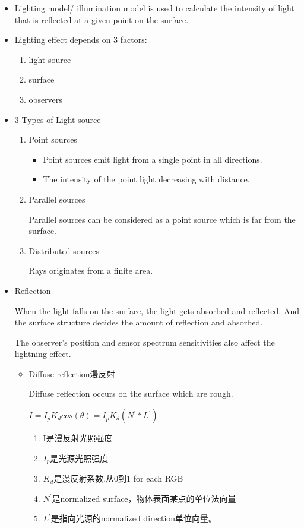 \documentclass[UTF8]{ctexart}
\begin{document}
\begin{itemize}
    \item Lighting model/ illumination model is used to calculate the intensity of light that is reflected at a given point on the surface.
    \item Lighting effect depends on 3 factors:
    \begin{enumerate}
        \item light source 
        \item surface 
        \item observers
    \end{enumerate}
    \item 3 Types of Light source 
    \begin{enumerate}
        \item Point sources
        \begin{itemize}
            \item Point sources emit light from a single point in all directions.
            \item The intensity of the point light decreasing with distance.
        \end{itemize}
        \item Parallel sources
        
        Parallel sources can be considered as a point source which is far from the surface.

        \item Distributed sources
        
        Rays originates from a finite area.

    \end{enumerate}
    \item Reflection
    
    When the light falls on the surface, the light gets absorbed and reflected. And the surface structure decides the amount of reflection and absorbed.

    The observer's position and sensor spectrum sensitivities also affect the lightning effect.


    \begin{itemize}
        \item Diffuse reflection漫反射
        
        Diffuse reflection occurs on the surface which are rough.

        $I=I_p K_d cos(\theta)=I_p K_d (N^{'}*L^{'})$
        \begin{enumerate}
            \item I是漫反射光照强度
            \item $I_p$是光源光照强度
            \item $K_d$是漫反射系数,从0到1 for each RGB
            \item $N^{'}$是normalized surface，物体表面某点的单位法向量
            \item $L^{'}$是指向光源的normalized direction单位向量。
        \end{enumerate}
        

\end{itemize}
\end{itemize}
\end{document}
